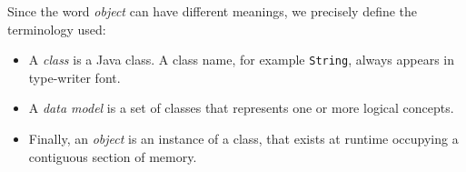 Since the word \textit{object} can have different meanings, we precisely define the terminology used:
\begin{itemize}
\item A \textit{class} is a Java class. A class name, for example \texttt{String}, always appears in type-writer font. 
\item A \textit{data model} is a set of classes that represents one or more logical concepts.
\item Finally, an \textit{object} is an instance of a class, that exists at runtime occupying a contiguous section of memory.
\end{itemize} 







 


